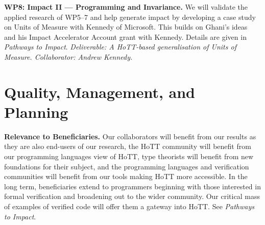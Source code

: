 \documentclass[a4paper,11pt]{article}
\begin{document}
{\bf WP8: Impact II --- Programming and Invariance.}  We will validate
the applied research of WP5--7 and help generate impact by developing a
case study on Units of Measure with Kennedy of Microsoft. This builds
on Ghani's ideas~\cite{uom} and his Impact Accelerator Account grant
with Kennedy. Details are given in {\em Pathways to Impact}. {\em
  Deliverable: A HoTT-based generalisation of Units of
  Measure. Collaborator: Andrew Kennedy.  }


\vspace*{-0.2in}

\section{Quality, Management, and Planning}

\vspace*{-0.1in}

{\bf Relevance to Beneficiaries.} Our collaborators will benefit from
our results as they are also end-users of our research, 
the HoTT community will benefit from our programming languages
view of HoTT, type theorists will benefit from new
foundations for their subject, and the programming languages and
verification communities will benefit from our tools making HoTT more
accessible. In the long term, beneficiaries extend to
programmers beginning with those interested in formal
verification and broadening out to the wider community. Our critical
mass of examples of verified code will offer them a gateway
into HoTT. See {\em Pathways to Impact}.




 
\end{document}

